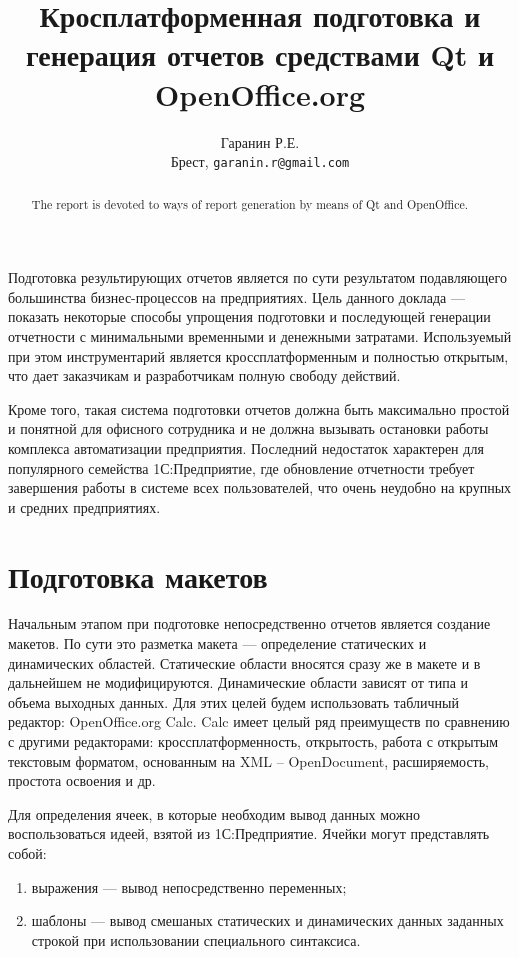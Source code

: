 \documentclass[10pt, a5paper]{article}
\begin{document}
\title{Кросплатформенная подготовка и генерация отчетов средствами Qt и OpenOffice.org}
\author{Гаранин Р.Е.
\\
\small Брест, \texttt{garanin.r@gmail.com}
}
\maketitle

\begin{abstract}
The report is devoted to ways of report generation by means of Qt and OpenOffice.
\end{abstract}

Подготовка результирующих отчетов является по сути результатом подавляющего большинства бизнес-процессов на предприятиях. Цель данного доклада — показать некоторые способы упрощения подготовки и последующей генерации отчетности с минимальными временными и денежными затратами. Используемый при этом инструментарий является кроссплатформенным и полностью открытым, что дает заказчикам и разработчикам полную свободу действий.

Кроме того, такая система подготовки отчетов должна быть максимально простой и понятной для офисного сотрудника и не должна вызывать остановки работы комплекса автоматизации предприятия. Последний недостаток характерен для популярного семейства 1С:Предприятие, где обновление отчетности требует завершения работы в системе всех пользователей, что очень неудобно на крупных и средних предприятиях.

\section*{Подготовка макетов}
Начальным этапом при подготовке непосредственно отчетов является создание макетов. По сути это разметка макета — определение статических и динамических областей. Статические области вносятся сразу же в макете и в дальнейшем не модифицируются. Динамические области зависят от типа и объема выходных данных. Для этих целей будем использовать табличный редактор: OpenOffice.org Calc. Calc имеет целый ряд преимуществ по сравнению с другими редакторами: кроссплатформенность, открытость, работа с открытым текстовым форматом, основанным на XML – OpenDocument, расширяемость, простота освоения и др.

Для определения ячеек, в которые необходим вывод данных можно воспользоваться идеей, взятой из 1С:Предприятие. Ячейки могут представлять собой:
\begin{enumerate}
\item выражения --- вывод непосредственно переменных;
\item шаблоны --- вывод смешаных статических и динамических данных заданных строкой при использовании специального синтаксиса.
\end{enumerate}
\end{document}
